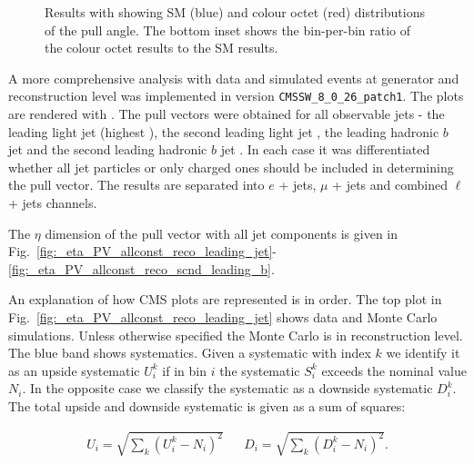 \begin{figure}[htp]
\centering
  \def\twidth{0.45}
  \centering
  \hfil
\caption{Results with \RIVET showing SM (blue) and \PW colour octet (red) distributions of the pull angle. The bottom inset shows the bin-per-bin ratio of the \PW colour octet results to the SM results.}
\label{fig:resultsRivet}
\end{figure}

A more comprehensive analysis with data and simulated events at generator and reconstruction level was implemented in \CMSSW version \lstinline[language=sh]|CMSSW_8_0_26_patch1|. The plots are rendered with \ROOT \cite{Brun}. The pull vectors were obtained for all observable jets - the leading light jet \leadingjet (highest \pt), the second leading light jet \scndleadingjet, the leading hadronic $b$ jet \leadingb and the second leading hadronic $b$ jet \scndleadingb. In each case it was differentiated whether all jet particles or only charged ones should be included in determining the pull vector. The results are separated into $e$ + jets, $\mu$ + jets and combined $\ell$ + jets channels.

The $\eta$ dimension of the pull vector with all jet components is given in Fig.~\ref{fig:_eta_PV_allconst_reco_leading_jet}-\ref{fig:_eta_PV_allconst_reco_scnd_leading_b}.

An explanation of how CMS plots are represented is in order. The top plot in Fig.~\ref{fig:_eta_PV_allconst_reco_leading_jet} shows data and Monte Carlo simulations. Unless otherwise specified the Monte Carlo is in reconstruction level. The blue band shows systematics. Given a systematic with index $k$ we identify it as an upside systematic $U^{k}_{i}$ if in bin $i$ the systematic $S^{k}_i$ exceeds the nominal value $N_{i}$. In the opposite case we classify the systematic as a downside systematic $D^{k}_{i}$. The total upside and downside systematic is given as a sum of squares:

\begin{align}
U_{i}=\sqrt{\sum_{k}\left(U^{k}_{i}-N_{i}\right)^{2}} && D_{i}=\sqrt{\sum_{k}\left(D^{k}_{i}-N_{i}\right)^{2}}.
\end{align}

